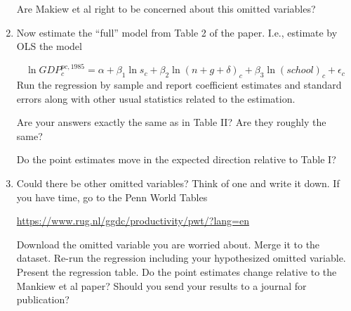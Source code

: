 \documentclass[11pt, a4paper]{article} %
\begin{document}
\begin{enumerate}
 \bigskip 
 
Are Makiew et al right to be concerned about this omitted variables?





\item Now estimate the ``full'' model from Table 2 of the paper.  I.e., estimate by OLS the model

\begin{equation*}
\ln GDP^{pc, 1985}_{c} = \alpha + \beta_1 \ln s_{c} + \beta_2 \ln \left(n + g + \delta \right)_{c}   + \beta_3 \ln \left(school\right)_{c} + \epsilon_{c}
\end{equation*}Run the regression by sample and report coefficient estimates and standard errors along with other usual statistics related to the estimation.
   

\bigskip

Are your answers exactly the same as in Table II?  Are they roughly the same? \\


\bigskip


Do the point estimates move in the expected direction relative to Table I?



\item Could there be other omitted variables?  Think of one and write it down.  If you have time, go to the Penn World Tables

\url{https://www.rug.nl/ggdc/productivity/pwt/?lang=en}

Download the omitted variable you are worried about.  Merge it to the dataset.  Re-run the regression including your hypothesized omitted variable.  Present the regression table.  Do the point estimates change relative to the Mankiew et al paper?  Should you send your results to a journal for publication?



\end{enumerate}




\end{document}

